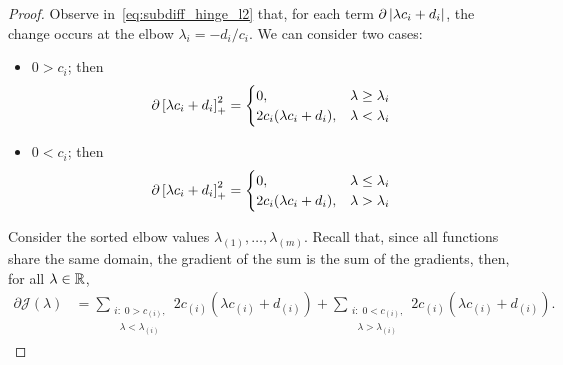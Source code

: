 \begin{proof}
    Observe in~\eqref{eq:subdiff_hinge_l2} that, for each term $\partial \left|\lambda c_i + d_i\right|$, the change occurs at the elbow $\lambda_{i} = - d_ i / c_i$. We can consider two cases:
    \begin{itemize}
        \item $0 > c_i$; then
        \begin{equation}
            \nonumber
            \begin{aligned}
                \partial \left[\lambda c_i + d_i\right]_{+}^2 = 
                \begin{cases}
                    0 ,& \lambda \geq \lambda_i \\
                    2 c_i (\lambda c_i + d_i) ,& \lambda < \lambda_i \\
                \end{cases}
            \end{aligned}
        \end{equation}
        \item $0 < c_i$; then
        \begin{equation}
            \nonumber
            \begin{aligned}
                \partial \left[\lambda c_i + d_i\right]_{+}^2 = 
                \begin{cases}
                    0 ,& \lambda \leq \lambda_i \\
                    2 c_i (\lambda c_i + d_i) ,& \lambda > \lambda_i \\
                \end{cases}
            \end{aligned}
        \end{equation}
    \end{itemize}
    Consider the sorted elbow values $\lambda_{(1)}, \ldots, \lambda_{(m)}$.
    Recall that, since all functions share the same domain, the gradient of the sum is the sum of the gradients, then, for all $\lambda \in \mathbb{R}$,
    \begin{equation}\nonumber
        \begin{aligned}
            \partial \mathcal{J}(\lambda) &=  \sum_{\substack{i:\; 0 > c_{(i)},\\ \;\; \lambda < \lambda_{(i)}}} {2 c_{(i)} (\lambda c_{(i)} + d_{(i)})} + \sum_{\substack{i:\; 0 < c_{(i)},\\ \;\; \lambda > \lambda_{(i)}}} {2 c_{(i)} (\lambda c_{(i)} + d_{(i)})}  .
        \end{aligned}        

\end{equation}
\end{proof}
